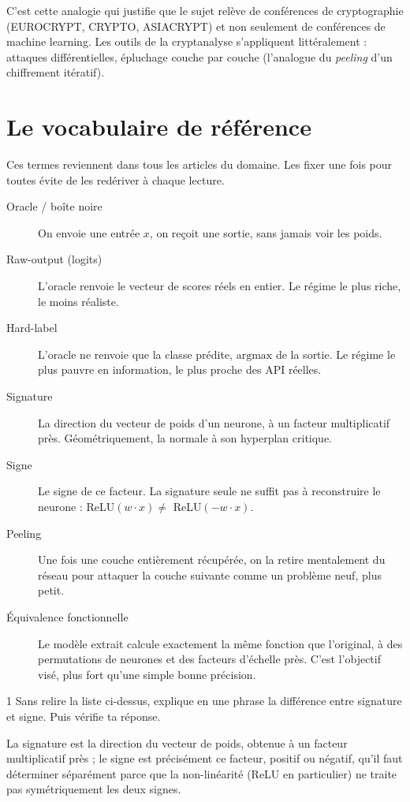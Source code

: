 \documentclass[11pt]{article}
\begin{document}
C'est cette analogie qui justifie que le sujet relève de conférences de cryptographie (EUROCRYPT, CRYPTO, ASIACRYPT) et non seulement de conférences de machine learning. Les outils de la cryptanalyse s'appliquent littéralement : attaques différentielles, épluchage couche par couche (l'analogue du \emph{peeling} d'un chiffrement itératif).

\section{Le vocabulaire de référence}

Ces termes reviennent dans tous les articles du domaine. Les fixer une fois pour toutes évite de les redériver à chaque lecture.

\begin{description}
  \item[Oracle / boîte noire] On envoie une entrée $x$, on reçoit une sortie, sans jamais voir les poids.
  \item[Raw-output (logits)] L'oracle renvoie le vecteur de scores réels en entier. Le régime le plus riche, le moins réaliste.
  \item[Hard-label] L'oracle ne renvoie que la classe prédite, $\mathrm{argmax}$ de la sortie. Le régime le plus pauvre en information, le plus proche des API réelles.
  \item[Signature] La direction du vecteur de poids d'un neurone, à un facteur multiplicatif près. Géométriquement, la normale à son hyperplan critique.
  \item[Signe] Le signe de ce facteur. La signature seule ne suffit pas à reconstruire le neurone : ReLU$(w\cdot x) \ne$ ReLU$(-w\cdot x)$.
  \item[Peeling] Une fois une couche entièrement récupérée, on la retire mentalement du réseau pour attaquer la couche suivante comme un problème neuf, plus petit.
  \item[Équivalence fonctionnelle] Le modèle extrait calcule exactement la même fonction que l'original, à des permutations de neurones et des facteurs d'échelle près. C'est l'objectif visé, plus fort qu'une simple bonne précision.
\end{description}

\begin{exo}{1}
Sans relire la liste ci-dessus, explique en une phrase la différence entre signature et signe. Puis vérifie ta réponse.
\end{exo}
\begin{sol}
La signature est la direction du vecteur de poids, obtenue à un facteur multiplicatif près ; le signe est précisément ce facteur, positif ou négatif, qu'il faut déterminer séparément parce que la non-linéarité (ReLU en particulier) ne traite pas symétriquement les deux signes.
\end{sol}
\end{document}
